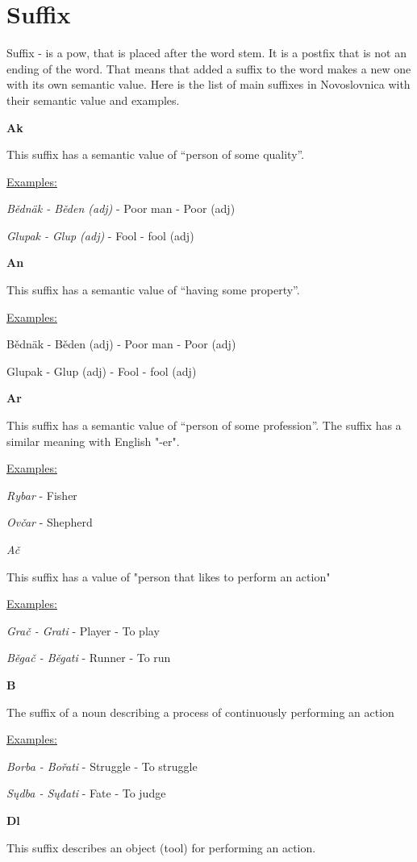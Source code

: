 \section{Suffix}

Suffix - is a \gls{pow}, that is placed after the word stem. It is a postfix that is not an ending of the word. That means that added a suffix to the word makes a new one with its own semantic value. Here is the list of main suffixes in Novoslovnica with their semantic value and examples.

\textbf{Ak}

This suffix has a semantic value of “person of some quality”.

\underline{Examples:}

\textit{Bědnäk - Běden (adj)} - Poor man - Poor (adj)

\textit{Glupak - Glup (adj)} - Fool - fool (adj)

\textbf{An}

This suffix has a semantic value of “having some property”.

\underline{Examples:}

Bědnäk - Běden (adj) - Poor man - Poor (adj)

Glupak - Glup (adj) - Fool - fool (adj)

\textbf{Ar}

This suffix has a semantic value of “person of some profession”. The suffix has a similar meaning with English "-er".

\underline{Examples:}

\textit{Rybar} - Fisher

\textit{Ovčar} - Shepherd

\textit{Ač}

This suffix has a value of "person that likes to perform an action"

\underline{Examples:}

\textit{Grač - Grati} - Player - To play

\textit{Běgač - Běgati} - Runner - To run

\textbf{B}

The suffix of a noun describing a process of continuously performing an action

\underline{Examples:}

\textit{Borba - Bořati} - Struggle - To struggle

\textit{Sųdba - Sųđati} - Fate - To judge

\textbf{Dl}

This suffix describes an object (tool) for performing an action.

